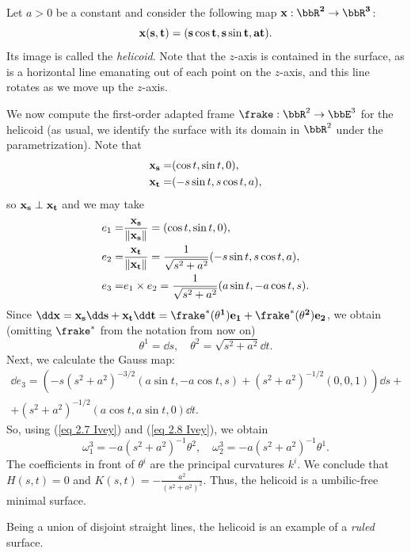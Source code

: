 \begin{example}[Helicoid]
    Let $a>0$ be a constant and consider the following map $\bf{x}:\bbR^2\to \bbR^3$:
    \[\bf{x}(s,t)=(s\cos t,s\sin t,at).\]
    Its image is called the \emph{helicoid}. Note that the $z$-axis is contained in the surface, as is a horizontal line emanating out of each point on the $z$-axis, and this line rotates as we move up the $z$-axis.
    
    We now compute the first-order adapted frame $\frake:\bbR^2\to \bbE^3$ for the helicoid (as usual, we identify the surface with its domain in $\bbR^2$ under the parametrization). Note that 
    \begin{align}
        \bf{x}_s=&(\cos t,\sin t,0),\\
        \bf{x}_t=&(-s\sin t,s\cos t,a),
    \end{align}
    so $\bf{x}_s\perp \bf{x}_t$ and we may take 
    \begin{align}
        e_1=&\frac{\bf{x}_s}{\lVert\bf{x}_s\rVert}=(\cos t,\sin t,0), \notag\\
        e_2=&\frac{\bf{x}_t}{\lVert\bf{x}_t\rVert}=\frac{1}{\sqrt{s^2+a^2}}(-s\sin t,s\cos t,a),\label{eq 2.7 Ivey}\\
        e_3=&e_1\times e_2=\frac{1}{\sqrt{s^2+a^2}}(a\sin t,-a\cos t,s).\notag
    \end{align}
    Since $\dd\bf{x}=\bf{x}_s\dd s+\bf{x}_t\dd t=\frake^\ast(\theta^1)e_1+\frake^\ast(\theta^2)e_2$, we obtain (omitting $\frake^\ast$ from the notation from now on)
    \[\theta^1=\dd s,\quad \theta^2=\sqrt{s^2+a^2} \dd t.\label{eq 2.8 Ivey}\]
    Next, we calculate the Gauss map:
    \begin{multline}
        \dd e_3=\left(-s\left(s^2+a^2\right)^{-3/2}(a\sin t,-a\cos t,s)+(s^2+a^2)^{-1/2}(0,0,1)\right)\dd s+\\
        +(s^2+a^2)^{-1/2}(a\cos t,a\sin t,0)\dd t.
    \end{multline}
    So, using (\ref{eq 2.7 Ivey}) and (\ref{eq 2.8 Ivey}), we obtain 
    \[\omega_1^3=-a(s^2+a^2)^{-1}\theta^2,\quad \omega_2^3=-a(s^2+a^2)^{-1}\theta^1.\]
    The coefficients in front of $\theta^i$ are the principal curvatures $k^i$. We conclude that $H(s,t)=0$ and $K(s,t)=-\frac{a^2}{(s^2+a^2)^2}$. Thus, the helicoid is a umbilic-free minimal surface.
\end{example}

Being a union of disjoint straight lines, the helicoid is an example of a \emph{ruled} surface.

